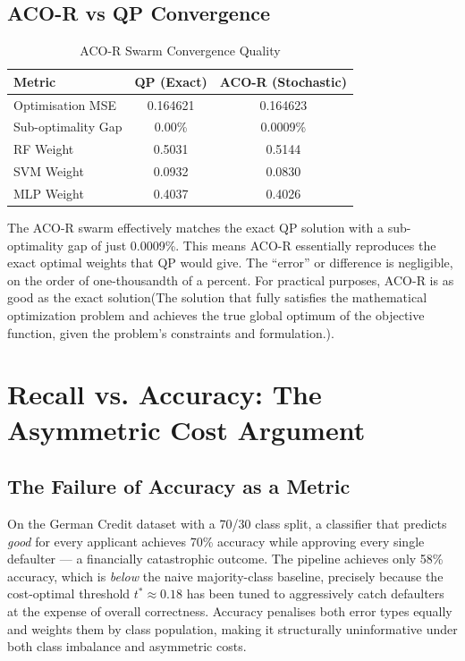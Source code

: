 \documentclass[12pt,a4paper]{article}
\begin{document}
\subsection{ACO-R vs QP Convergence}

\begin{table}[H]
\centering
\caption{ACO-R Swarm Convergence Quality}
\label{tab:aco}
\begin{tabular}{lcc}
\toprule
\textbf{Metric} & \textbf{QP (Exact)} & \textbf{ACO-R (Stochastic)} \\
\midrule
Optimisation MSE  & 0.164621 & 0.164623 \\
Sub-optimality Gap& 0.00\%   & 0.0009\% \\
\midrule
RF Weight  & 0.5031 & 0.5144 \\
SVM Weight & 0.0932 & 0.0830 \\
MLP Weight & 0.4037 & 0.4026 \\
\bottomrule
\end{tabular}
\end{table}

The ACO-R swarm effectively matches the exact QP solution with a sub-optimality gap of just 0.0009\%.
This means ACO-R essentially reproduces the exact optimal weights that QP would give.
The “error” or difference is negligible, on the order of one-thousandth of a percent.
For practical purposes, ACO-R is as good as the exact solution(The solution that fully satisfies the mathematical optimization problem and achieves the true global optimum of the objective function, given the problem’s constraints and formulation.).
\pagebreak
\section{Recall vs. Accuracy: The Asymmetric Cost Argument}

\subsection{The Failure of Accuracy as a Metric}

On the German Credit dataset with a 70/30 class split, a classifier that predicts
\textit{good} for every applicant achieves 70\% accuracy while approving every
single defaulter --- a financially catastrophic outcome. The pipeline achieves
only 58\% accuracy, which is \textit{below} the naive majority-class baseline,
precisely because the cost-optimal threshold $t^* \approx 0.18$ has been tuned
to aggressively catch defaulters at the expense of overall correctness. Accuracy
penalises both error types equally and weights them by class population, making
it structurally uninformative under both class imbalance and asymmetric costs.
\end{document}
